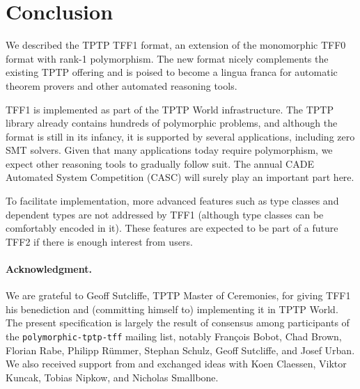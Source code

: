 \section{Conclusion}
\label{sec_concl}

We described the TPTP TFF1 format, an extension of the monomorphic TFF0 format
with rank-1 polymorphism. The new format nicely complements the existing TPTP
offering and is poised to become a lingua franca for automatic theorem provers
and other automated reasoning tools.

TFF1 is implemented as part of the TPTP World infrastructure. The TPTP library
already contains hundreds of polymorphic problems, and although the format is
still in its infancy, it is supported by several applications, including zero
SMT solvers. Given that many applications today require polymorphism, we expect
other reasoning tools to gradually follow suit. The annual CADE Automated System
Competition (CASC) will surely play an important part here.

To facilitate implementation, more advanced features such as type classes and
dependent types are not addressed by TFF1 (although type classes can be
comfortably encoded in it). These features are expected to be part of a future
TFF2 if there is enough interest from users.

\def\ackname{Acknowledgment}
\paragraph{\textbf{\upshape\ackname.}}
%
We are grateful to Geoff Sutcliffe, TPTP Master of Ceremonies, for giving TFF1
his benediction and (committing himself to) implementing it in TPTP World. The
present specification is largely the result of consensus among participants of
the {\tt polymorphic-tptp-tff} mailing list, notably Fran\c{c}ois Bobot, Chad
Brown, Florian Rabe, Philipp R\"ummer, Stephan Schulz, Geoff Sutcliffe, and
Josef Urban. We also received support from and exchanged ideas with Koen
Claessen, Viktor Kuncak, Tobias Nipkow, and Nicholas Smallbone.
